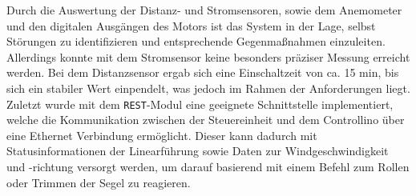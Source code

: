 \noindent
Durch die Auswertung der Distanz- und Stromsensoren, sowie dem Anemometer und den digitalen Ausgängen des Motors ist das System in der Lage, selbst Störungen zu identifizieren und entsprechende Gegenmaßnahmen einzuleiten. Allerdings konnte mit dem Stromsensor keine besonders präziser Messung erreicht werden. Bei dem Distanzsensor ergab sich eine Einschaltzeit von ca. 15 min, bis sich ein stabiler Wert einpendelt, was jedoch im Rahmen der Anforderungen liegt.\\

\noindent
Zuletzt wurde mit dem \texttt{REST}-Modul eine geeignete Schnittstelle implementiert, welche die Kommunikation zwischen der Steuereinheit und dem Controllino über eine Ethernet Verbindung ermöglicht. Dieser kann dadurch mit Statusinformationen der Linearführung sowie Daten zur Windgeschwindigkeit und -richtung versorgt werden, um darauf basierend mit einem Befehl zum Rollen oder Trimmen der Segel zu reagieren.
